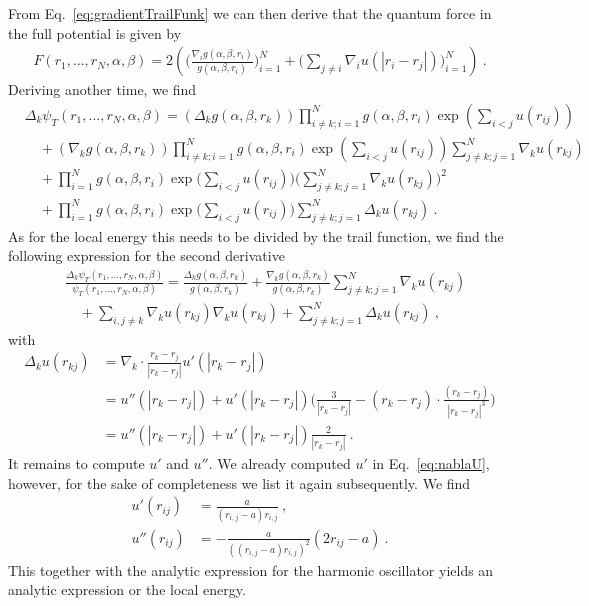 \documentclass[11pt,a4paper]{article}
\numberwithin{equation}{section}
\begin{document}
From Eq.~\eqref{eq:gradientTrailFunk} we can then derive that the quantum force in the full potential is given by
\begin{align*}
F(r_1,...,r_N,\alpha,\beta)
=
2\left(
\Bigg(\frac{\nabla_i g(\alpha,\beta,{r}_i)}{g(\alpha,\beta,{r}_i)}\Bigg)_{i=1}^N
+
\Bigg(\sum_{j\neq i}\nabla_i u(|r_i-r_j|) \Bigg)_{i=1}^N
\right)~.
\end{align*}
Deriving another time, we find
\begin{equation}
\label{eq:LaplaceTrailFunk}
\begin{aligned}
&\Delta_k\psi_T(r_1,...,r_N,\alpha,\beta)
=
\left(\Delta_kg(\alpha,\beta,{r}_k)\right)\prod_{i\neq k;i=1}^N g(\alpha,\beta,{r}_i)\exp{\left(\sum_{i<j}u(r_{ij})\right)}\\
&\quad +
\left(\nabla_kg(\alpha,\beta,{r}_k)\right)\prod_{i\neq k;i=1}^N g(\alpha,\beta,{r}_i)\exp\left(\sum_{i<j}u(r_{ij})\right)\sum_{j\neq k;j=1}^N\nabla_k u(r_{kj})\\
&\quad +
\prod_{i=1}^N g(\alpha,\beta,{r}_i)\exp{\Bigg(\sum_{i<j}u(r_{ij})\Bigg)}\Bigg(\sum_{j\neq k;j=1}^N\nabla_k u(r_{kj})\Bigg)^2\\
&\quad +
\prod_{i=1}^N g(\alpha,\beta,{r}_i)\exp{\Bigg(\sum_{i<j}u(r_{ij})\Bigg)}\sum_{j\neq k;j=1}^N\Delta_k u(r_{kj})~.
\end{aligned}
\end{equation}
As for the local energy this needs to be divided by the trail function, we find the following expression for the second derivative
\begin{equation}
\label{eq:LaplaceTrailFunkQuot}
\begin{aligned}
&\frac{\Delta_k\psi_T(r_1,...,r_N,\alpha,\beta)}{\psi_T(r_1,...,r_N,\alpha,\beta)}
=
\frac{\Delta_kg(\alpha,\beta,{r}_k)}{g(\alpha,\beta,{r}_k)}
+
\frac{\nabla_kg(\alpha,\beta,{r}_k)}{g(\alpha,\beta,{r}_k)}\sum_{j\neq k;j=1}^N\nabla_k u(r_{kj})\\
&\quad +
\sum_{i,j\neq k}\nabla_k u(r_{kj})\nabla_k u(r_{kj})
+
\sum_{j\neq k;j=1}^N\Delta_k u(r_{kj})~,
\end{aligned}
\end{equation}
with 
\begin{align*}
\Delta_ku(r_{kj})
&=
\nabla_k\cdot \frac{r_k-r_j}{|r_k-r_j|}u'(|r_k-r_j|)\\
&=
u''(|r_k-r_j|)
+
u'(|r_k-r_j|)\Bigg(
\frac{3}{|r_k-r_j|}
-(r_k-r_j)\cdot\frac{(r_k-r_j)}{|r_k-r_j|^3}
\Bigg)\\
&=
u''(|r_k-r_j|)
+
u'(|r_k-r_j|)
\frac{2}{|r_k-r_j|}~.
\end{align*}
It remains to compute $u'$ and $u''$.
%
We already computed $u'$ in Eq.~\eqref{eq:nablaU}, however, for the sake of completeness we list it again subsequently.
%
We find
\begin{align*}
u'(r_{ij})&=\frac{a}{(r_{i,j}-a)r_{i,j}}~,\\
u''(r_{ij})&=-\frac{a}{((r_{i,j}-a)r_{i,j})^2}(2r_{ij}-a)~.
\end{align*} 
This together with the analytic expression for the harmonic oscillator yields an analytic expression or the local energy.
\end{document}
